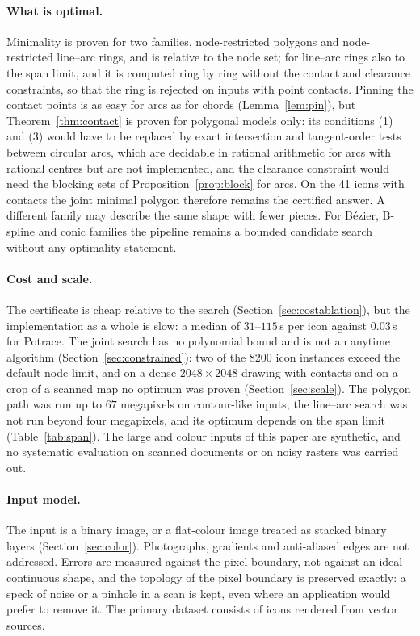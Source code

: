 \documentclass[11pt,a4paper]{article}
\theoremstyle{definition}
\theoremstyle{remark}
\begin{document}
\paragraph{What is optimal.} Minimality is proven for two families,
node-restricted polygons and node-restricted line--arc rings, and is
relative to the node set; for line--arc rings also to the span limit, and it
is computed ring by ring without the contact and clearance constraints, so
that the ring is rejected on inputs with point contacts. Pinning the contact
points is as easy for arcs as for chords (Lemma~\ref{lem:pin}), but
Theorem~\ref{thm:contact} is proven for polygonal models only: its conditions
(1) and (3) would have to be replaced by exact intersection and
tangent-order tests between circular arcs, which are decidable in rational
arithmetic for arcs with rational centres but are not implemented, and the
clearance constraint would need the blocking sets of
Proposition~\ref{prop:block} for arcs. On the 41 icons with contacts the
joint minimal polygon therefore remains the certified answer. A different family
may describe the same shape with fewer pieces. For B\'ezier, B-spline and
conic families the pipeline remains a bounded candidate search without any
optimality statement.

\paragraph{Cost and scale.} The certificate is cheap relative to the search
(Section~\ref{sec:costablation}), but the implementation as a whole is slow:
a median of $31$--$115$\,s per icon against $0.03$\,s for Potrace. The joint
search has no polynomial bound and is not an anytime algorithm
(Section~\ref{sec:constrained}): two of the 8200 icon instances exceed the
default node limit, and on a dense $2048\times2048$ drawing with contacts and
on a crop of a scanned map no optimum was proven (Section~\ref{sec:scale}).
The polygon path was run up to $67$ megapixels on contour-like inputs; the
line--arc search was not run beyond four megapixels, and its optimum depends
on the span limit (Table~\ref{tab:span}). The large and colour inputs of this
paper are synthetic, and no systematic evaluation on scanned documents or on
noisy rasters was carried out.

\paragraph{Input model.} The input is a binary image, or a flat-colour image
treated as stacked binary layers (Section~\ref{sec:color}). Photographs,
gradients and anti-aliased edges are not addressed. Errors are measured
against the pixel boundary, not against an ideal continuous shape, and the
topology of the pixel boundary is preserved exactly: a speck of noise or a
pinhole in a scan is kept, even where an application would prefer to remove
it. The primary dataset consists of icons rendered from vector sources.
\end{document}

